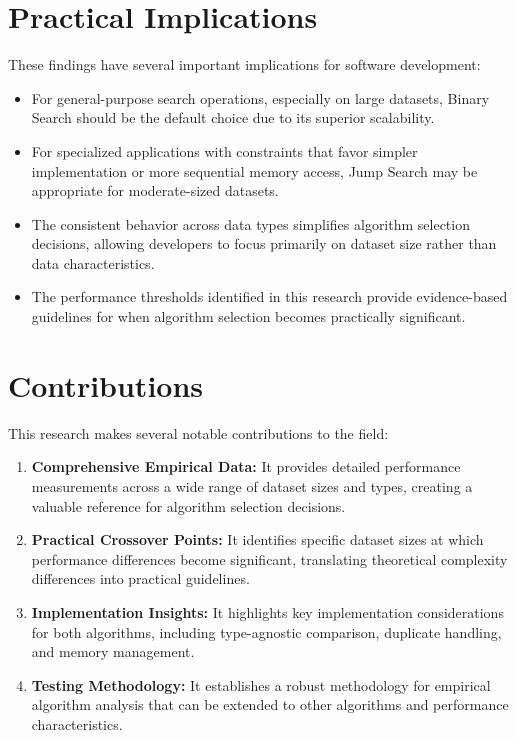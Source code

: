 \section{Practical Implications}

These findings have several important implications for software development:

\begin{itemize}
    \item For general-purpose search operations, especially on large datasets, Binary Search should be the default choice due to its superior scalability.
    
    \item For specialized applications with constraints that favor simpler implementation or more sequential memory access, Jump Search may be appropriate for moderate-sized datasets.
    
    \item The consistent behavior across data types simplifies algorithm selection decisions, allowing developers to focus primarily on dataset size rather than data characteristics.
    
    \item The performance thresholds identified in this research provide evidence-based guidelines for when algorithm selection becomes practically significant.
\end{itemize}

\section{Contributions}

This research makes several notable contributions to the field:

\begin{enumerate}
    \item \textbf{Comprehensive Empirical Data:} It provides detailed performance measurements across a wide range of dataset sizes and types, creating a valuable reference for algorithm selection decisions.
    
    \item \textbf{Practical Crossover Points:} It identifies specific dataset sizes at which performance differences become significant, translating theoretical complexity differences into practical guidelines.
    
    \item \textbf{Implementation Insights:} It highlights key implementation considerations for both algorithms, including type-agnostic comparison, duplicate handling, and memory management.
    
    \item \textbf{Testing Methodology:} It establishes a robust methodology for empirical algorithm analysis that can be extended to other algorithms and performance characteristics.
\end{enumerate}

